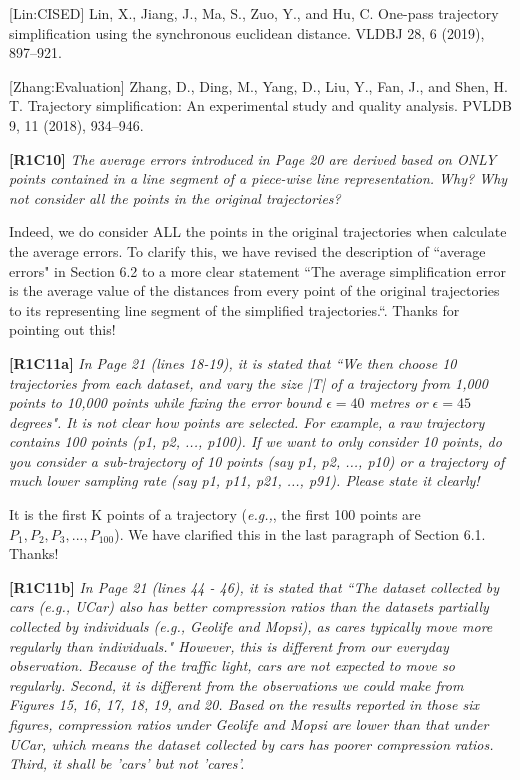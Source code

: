 \documentclass{letter}
\newcommand{\eg}{\emph{e.g.,}\xspace}
\begin{document}
{[Lin:CISED] Lin, X., Jiang, J., Ma, S., Zuo, Y., and Hu, C. One-pass trajectory simplification using the synchronous euclidean distance. VLDBJ 28, 6 (2019), 897–921.

[Zhang:Evaluation] Zhang, D., Ding, M., Yang, D., Liu, Y., Fan, J., and Shen, H. T. Trajectory simplification: An experimental study and quality analysis. PVLDB 9, 11 (2018), 934–946.

\textbf{[R1C10]} \emph{The average errors introduced in Page 20 are derived based on ONLY points contained in a line segment of a piece-wise line representation. Why? Why not consider all the points in the original trajectories? }

Indeed, we do consider ALL the points in the original trajectories when calculate the average errors. To clarify this, we have revised the description of ``average errors" in Section 6.2 to a more clear statement ``{The average simplification error is the average value of the distances from every point of the original trajectories to its representing line segment of the simplified trajectories.}``. Thanks for pointing out this!


\textbf{[R1C11a]} \emph{ In Page 21 (lines 18-19), it is stated that ``We then choose 10 trajectories from each dataset, and vary the size |T| of a trajectory from 1,000 points to 10,000 points while fixing the error bound $\epsilon = 40$ metres or $\epsilon = 45$ degrees". It is not clear how points are selected. For example, a raw trajectory contains 100 points (p1, p2, ..., p100). If we want to only consider 10 points, do you consider a sub-trajectory of 10 points (say p1, p2, ..., p10) or a trajectory of much lower sampling rate (say p1, p11, p21, ..., p91). Please state it clearly!}

It is the first K points of a trajectory (\eg, the first 100 points are $P_1, P_2, P_3, ..., P_{100}$). We have clarified this in the last paragraph of Section 6.1. Thanks!

\textbf{[R1C11b]} \emph{ In Page 21 (lines 44 - 46), it is stated that ``The dataset collected by cars (e.g., UCar) also has better compression ratios than the datasets partially collected by individuals (e.g., Geolife and Mopsi), as cares typically move more regularly than individuals." However, this is different from our everyday observation. Because of the traffic light, cars are not expected to move so regularly. Second, it is different from the observations we could make from Figures 15, 16, 17, 18, 19, and 20. Based on the results reported in those six figures, compression ratios under Geolife and Mopsi are lower than that under UCar, which means the dataset collected by cars has poorer compression ratios. Third, it shall be 'cars' but not 'cares'. }

}
\end{document}
